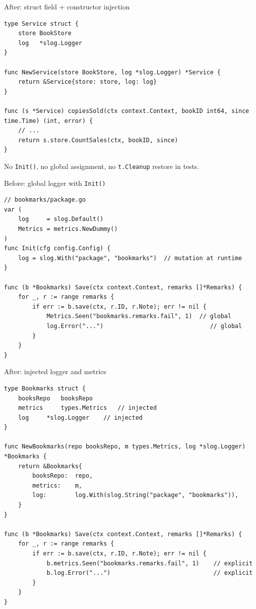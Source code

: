\documentclass[aspectratio=169,11pt]{beamer}
\begin{document}
\begin{frame}[fragile]{After: struct field + constructor injection}
\begin{lstlisting}
type Service struct {
	store BookStore
	log   *slog.Logger
}

func NewService(store BookStore, log *slog.Logger) *Service {
	return &Service{store: store, log: log}
}

func (s *Service) copiesSold(ctx context.Context, bookID int64, since time.Time) (int, error) {
	// ...
	return s.store.CountSales(ctx, bookID, since)
}
\end{lstlisting}
  \vspace{4pt}
  {\small No \texttt{Init()}, no global assignment, no \texttt{t.Cleanup} restore in tests.}
\end{frame}

\begin{frame}[fragile]{Before: global logger with \texttt{Init()}}
\begin{lstlisting}
// bookmarks/package.go
var (
	log     = slog.Default()
	Metrics = metrics.NewDummy()
)
func Init(cfg config.Config) {
	log = slog.With("package", "bookmarks")  // mutation at runtime
}

func (b *Bookmarks) Save(ctx context.Context, remarks []*Remarks) {
	for _, r := range remarks {
		if err := b.save(ctx, r.ID, r.Note); err != nil {
			Metrics.Seen("bookmarks.remarks.fail", 1)  // global
			log.Error("...")                              // global
		}
	}
}
\end{lstlisting}
\end{frame}

\begin{frame}[fragile]{After: injected logger and metrics}
\begin{lstlisting}
type Bookmarks struct {
	booksRepo	booksRepo
	metrics		types.Metrics	// injected
	log		*slog.Logger	// injected
}

func NewBookmarks(repo booksRepo, m types.Metrics, log *slog.Logger) *Bookmarks {
	return &Bookmarks{
		booksRepo:	repo,
		metrics:	m,
		log:		log.With(slog.String("package", "bookmarks")),
	}
}

func (b *Bookmarks) Save(ctx context.Context, remarks []*Remarks) {
	for _, r := range remarks {
		if err := b.save(ctx, r.ID, r.Note); err != nil {
			b.metrics.Seen("bookmarks.remarks.fail", 1)    // explicit
			b.log.Error("...")                             // explicit
		}
	}
}
\end{lstlisting}
\end{frame}
\end{document}
